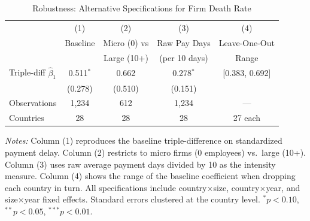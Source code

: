 \begin{table}[htbp]
\centering
\caption{Robustness: Alternative Specifications for Firm Death Rate}
\label{tab:robustness}
\begin{tabular}{lcccc}
\hline\hline
 & (1) & (2) & (3) & (4) \\
 & Baseline & Micro (0) vs & Raw Pay Days & Leave-One-Out \\
 &  & Large (10+) & (per 10 days) & Range \\
\hline
Triple-diff $\hat{\beta}_1$ & 0.511$^{*}$ & 0.662 & 0.278$^{*}$ & [0.383, 0.692] \\
 & (0.278) & (0.510) & (0.151) & \\
\hline
Observations & 1,234 & 612 & 1,234 & --- \\
Countries & 28 & 28 & 28 & 27 each \\
\hline\hline
\end{tabular}
\begin{tablenotes}[flushleft]\footnotesize
\item \textit{Notes:} Column (1) reproduces the baseline triple-difference on standardized payment delay. Column (2) restricts to micro firms (0 employees) vs.\ large (10+). Column (3) uses raw average payment days divided by 10 as the intensity measure. Column (4) shows the range of the baseline coefficient when dropping each country in turn. All specifications include country$\times$size, country$\times$year, and size$\times$year fixed effects. Standard errors clustered at the country level. $^{*}p<0.10$, $^{**}p<0.05$, $^{***}p<0.01$.
\end{tablenotes}
\end{table}
